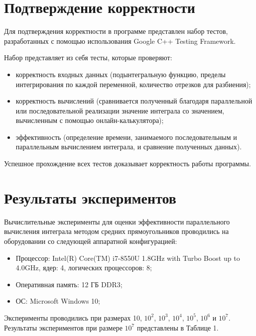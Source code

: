 \documentclass{report}
\begin{document}
\section*{Подтверждение корректности}
Для подтверждения корректности в программе представлен набор тестов, разработанных с помощью использования Google C++ Testing Framework.
\par Набор представляет из себя тесты, которые проверяют:
\begin{itemize}
\item корректность входных данных (подынтегральную функцию, пределы интегрирования по каждой переменной, количество отрезков для разбиения);
\item корректность вычислений (сравнивается полученный благодаря параллельной или последовательной реализации значение интеграла со значением, вычисленным с помощью онлайн-калькулятора);
\item эффективность (определение времени, занимаемого последовательным и параллельным вычислением интеграла, и сравнение полученных данных).
\end{itemize}
\par Успешное прохождение всех тестов доказывает корректность работы программы.
\newpage

\section*{Результаты экспериментов}
Вычислительные эксперименты для оценки эффективности параллельного вычисления интеграла методом средних прямоугольников проводились на оборудовании со следующей аппаратной конфигурацией:

\begin{itemize}
\item Процессор: Intel(R) Core(TM) i7-8550U 1.8GHz with Turbo Boost up to 4.0GHz, ядер: 4, логических процессоров: 8;
\item Оперативная память: 12 ГБ DDR3;
\item ОС: Microsoft Windows 10;
\end{itemize}

\par Эксперименты проводились при размерах 10, $10^2$, $10^3$, $10^4$, $10^5$, $10^6$ и $10^7$. Результаты экспериментов при размере $10^7$ представлены в Таблице 1.
\end{document}
